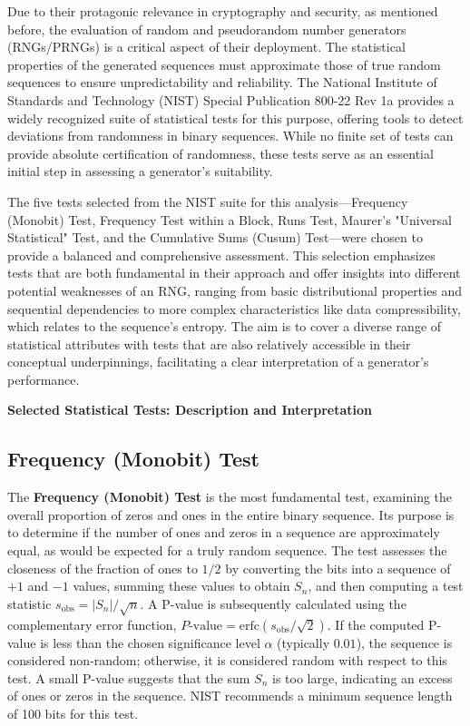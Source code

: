 Due to their protagonic relevance in cryptography and security, as mentioned before, the evaluation of random and pseudorandom number generators (RNGs/PRNGs) is a critical aspect of their deployment. The statistical properties of the generated sequences must approximate those of true random sequences to ensure unpredictability and reliability. The National Institute of Standards and Technology (NIST) Special Publication 800-22 Rev 1a provides a widely recognized suite of statistical tests for this purpose, offering tools to detect deviations from randomness in binary sequences. While no finite set of tests can provide absolute certification of randomness, these tests serve as an essential initial step in assessing a generator's suitability.

The five tests selected from the NIST suite for this analysis---Frequency (Monobit) Test, Frequency Test within a Block, Runs Test, Maurer's "Universal Statistical" Test, and the Cumulative Sums (Cusum) Test---were chosen to provide a balanced and comprehensive assessment. This selection emphasizes tests that are both fundamental in their approach and offer insights into different potential weaknesses of an RNG, ranging from basic distributional properties and sequential dependencies to more complex characteristics like data compressibility, which relates to the sequence's entropy. The aim is to cover a diverse range of statistical attributes with tests that are also relatively accessible in their conceptual underpinnings, facilitating a clear interpretation of a generator's performance.

\smallskip

\textbf{Selected Statistical Tests: Description and Interpretation}

\smallskip

\subsection{\textbf{Frequency (Monobit) Test}}

The \textbf{Frequency (Monobit) Test} is the most fundamental test, examining the overall proportion of zeros and ones in the entire binary sequence. Its purpose is to determine if the number of ones and zeros in a sequence are approximately equal, as would be expected for a truly random sequence. The test assesses the closeness of the fraction of ones to $1/2$ by converting the bits into a sequence of $+1$ and $-1$ values, summing these values to obtain $S_n$, and then computing a test statistic $s_{\text{obs}} = |S_n| / \sqrt{n}$. A P-value is subsequently calculated using the complementary error function, $P\text{-value} = \text{erfc}(s_{\text{obs}} / \sqrt{2})$. If the computed P-value is less than the chosen significance level $\alpha$ (typically $0.01$), the sequence is considered non-random; otherwise, it is considered random with respect to this test. A small P-value suggests that the sum $S_n$ is too large, indicating an excess of ones or zeros in the sequence. NIST recommends a minimum sequence length of 100 bits for this test.

